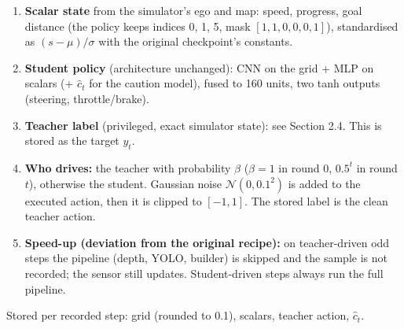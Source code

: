 \documentclass[11pt,a4paper]{article}
\begin{document}
\begin{enumerate}
\begin{itemize}
 \item every object gets the mean true footprint $2.0\times4.9$ m;
 \item duplicates merged if closer than 3.5 m forward and 1.6 m sideways (stereo and higher confidence kept).
 \end{itemize}
 The affine constants were fitted by least squares on 85 controlled placements (seeds 2000--2002; leave-one-scene-out median error front 1.58$\to$0.91 m, side 11.4$\to$1.3 m). Objects are then rasterised by the original \texttt{build\_bev\_grid} into a $64\times64$ grid (free 0, centreline 0.5, boundary 0.8, vehicle 1.0; ego at row 56, column 32) and the HD-map layers are added.
\item \textbf{Scalar state} from the simulator's ego and map: speed, progress, goal distance (the policy keeps indices 0, 1, 5, mask $[1,1,0,0,0,1]$), standardised as $(s-\mu)/\sigma$ with the original checkpoint's constants.
\item \textbf{Student policy} (architecture unchanged): CNN on the grid + MLP on scalars (+ $\hat c_t$ for the caution model), fused to 160 units, two tanh outputs (steering, throttle/brake).
\item \textbf{Teacher label} (privileged, exact simulator state): see Section 2.4. This is stored as the target $y_t$.
\item \textbf{Who drives:} the teacher with probability $\beta$ ($\beta=1$ in round 0, $0.5^{t}$ in round $t$), otherwise the student. Gaussian noise $\mathcal N(0,0.1^2)$ is added to the executed action, then it is clipped to $[-1,1]$. The stored label is the clean teacher action.
\item \textbf{Speed-up (deviation from the original recipe):} on teacher-driven odd steps the pipeline (depth, YOLO, builder) is skipped and the sample is not recorded; the sensor still updates. Student-driven steps always run the full pipeline.
\end{enumerate}
Stored per recorded step: grid (rounded to 0.1), scalars, teacher action, $\hat c_t$.
\end{document}
